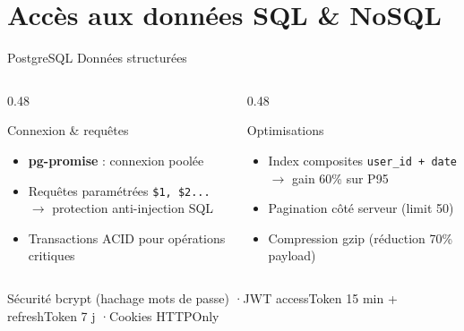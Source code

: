 \documentclass[aspectratio=169]{beamer}
\begin{document}
\section{Accès aux données SQL \& NoSQL}

\begin{frame}{PostgreSQL  Données structurées}
  \begin{columns}[t]
    \begin{column}{0.48\textwidth}
      \begin{block}{Connexion \& requêtes}
        \begin{itemize}
          \item \textbf{pg-promise} : connexion poolée
          \item Requêtes paramétrées \texttt{\$1, \$2...}\\$\rightarrow$ protection anti-injection SQL
          \item Transactions ACID pour opérations critiques
        \end{itemize}
      \end{block}
    \end{column}
    \begin{column}{0.48\textwidth}
      \begin{block}{Optimisations}
        \begin{itemize}
          \item Index composites \texttt{user\_id + date}\\$\rightarrow$ gain 60\% sur P95
          \item Pagination côté serveur (limit 50)
          \item Compression gzip (réduction 70\% payload)
        \end{itemize}
      \end{block}
    \end{column}
  \end{columns}
  \vspace{0.4cm}
  \begin{alertblock}{Sécurité}
    \centering bcrypt (hachage mots de passe) \quad·\quad JWT accessToken 15 min + refreshToken 7 j \quad·\quad Cookies HTTPOnly
  \end{alertblock}
\end{frame}
\end{document}
